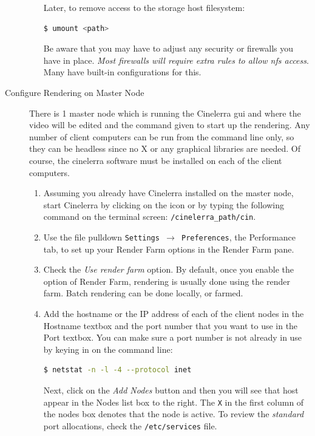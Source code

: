 \begin{description}
\begin{enumerate}
        Later, to remove access to the storage host filesystem:        
        \begin{lstlisting}[language=bash,numbers=none]
$ umount <path>
        \end{lstlisting}
        
        Be aware that you may have to adjust any security or firewalls you have in place.  \textit{Most firewalls will require extra rules to allow nfs access}.  Many have built-in configurations for this. 
    \end{enumerate}
    \item[Configure Rendering on Master Node] There is 1 master node which is running the Cinelerra gui and where the video will be edited and the command given to start up the rendering.  Any number of client computers can be run from the command line only, so they can be headless since no X or any graphical libraries are needed.  Of course, the cinelerra software must be installed on each of the client computers.
    \begin{enumerate}
        \item Assuming you already have Cinelerra installed on the master node, start Cinelerra by clicking on the
        icon or by typing the following command on the terminal screen:  \texttt{/{cinelerra\_path}/cin}.
        \item Use the file pulldown \texttt{Settings $\rightarrow$ Preferences}, the Performance tab, to set up your Render Farm
        options in the Render Farm pane.
        \item Check the \textit{Use render farm} option.  By default, once you enable the option of Render Farm, rendering is usually done using the render farm.  Batch rendering can be done locally, or farmed.
        \item Add the hostname or the IP address of each of the client nodes in the Hostname textbox and the port
        number that you want to use in the Port textbox.  You can make sure a port number is not already in
        use by keying in on the command line:
        \begin{lstlisting}[language=bash,numbers=none]
$ netstat -n -l -4 --protocol inet
        \end{lstlisting}
        Next, click on the \textit{Add Nodes}
        button and then you will see that host appear in the Nodes list box to the right.  The \texttt{X} in the first
        column of the nodes box denotes that the node is active.  To review the \textit{standard} port allocations,
        check the \texttt{/etc/services} file.

\end{enumerate}
\end{description}
